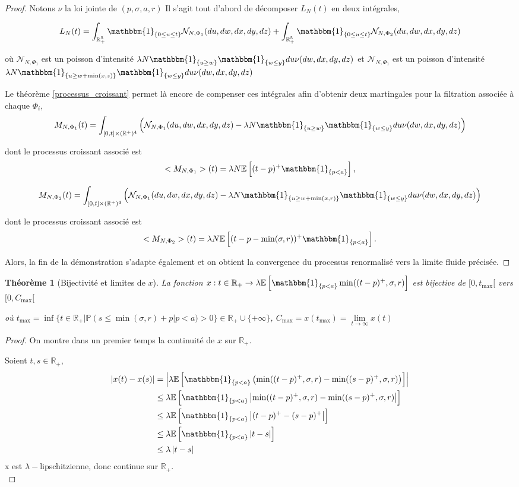 \documentclass[12pt,a4paper]{article}
\newcommand{\E}[1]{\mathbb{E}\left[ #1 \right]}
\newcommand{\R}{\mathbb{R}}
\newcommand{\1}[1]{\mathbbm{1}_{\{#1\}} }
\newtheorem{theorem}{Théorème}
\theoremstyle{definition}
\begin{document}
{\begin{proof}
Notons $\nu$ la loi jointe de $(p,\sigma,a,r)$
Il s'agit tout d'abord de décomposer $L_N(t)$ en deux intégrales,

$$L_N(t) = \int_{\R_+^5} \1{0\leq u \leq t} \mathcal{N}_{N,\Phi_1}(du,dw,dx,dy,dz) + \int_{\R_+^5} \1{0\leq u \leq t} \mathcal{N}_{N,\Phi_2}(du,dw,dx,dy,dz)$$

où $\mathcal{N}_{N,\Phi_1}$ est un poisson d'intensité $\lambda N \1{u\geq w}\1{w\leq y} du \nu(dw,dx,dy,dz)$ et  $\mathcal{N}_{N,\Phi_1}$ est un poisson d'intensité $\lambda N \1{u\geq w + \min(x,z)}\1{w\leq y} du \nu(dw,dx,dy,dz)$


Le théorème \ref{processus_croissant} permet là encore de compenser ces intégrales afin d'obtenir deux martingales pour la filtration associée à chaque $\Phi_i$,
$$M_{N,\Phi_1}(t) = \int_{[0,t]\times (\R^+)^4}  \left(\mathcal{N}_{N,\Phi_1}(du,dw,dx,dy,dz)-\lambda N \1{u\geq w}\1{w\leq y} du \nu(dw,dx,dy,dz)\right)$$

dont le processus croissant associé est $$<M_{N,\Phi_1}>(t) = \lambda N \E{(t-p)^+\1{p<a}},$$

$$M_{N,\Phi_2}(t) = \int_{[0,t]\times (\R^+)^4}  \left(\mathcal{N}_{N,\Phi_1}(du,dw,dx,dy,dz)-\lambda N \1{u\geq w+\min(x,r)}\1{w\leq y} du \nu(dw,dx,dy,dz)\right)$$

dont le processus croissant associé est $$<M_{N,\Phi_2}>(t) = \lambda N \E{(t-p-\min(\sigma,r))^+\1{p<a}}.$$

Alors, la fin de la démonstration s'adapte également et on obtient la convergence du processus renormalisé vers la limite fluide précisée.

\end{proof}

\begin{theorem}[Bijectivité et limites de $x$]

La fonction $x:t\in \R_+\to  \lambda\E{\1{p<a}\min((t-p)^+,\sigma,r)}$ est bijective de $[0,t_{\max}[$ vers $[0,C_{\max}[$

où $t_{\max} =  \inf \{t \in \R_+ | \mathbb{P}\left(s \leq \min(\sigma,r) + p\right|p<a) > 0\} \in \R_+\cup \{+\infty\}$,
$C_{\max} = x(t_{\max}) = \underset{t\to \infty}{\lim} x(t)$

\end{theorem}

\begin{proof}

On montre dans un premier temps la continuité de $x$ sur $\R_+$.

Soient $t,s \in \R_+$,
\begin{align*}
|x(t) - x(s)| &=\left| \lambda\E{\1{p<a}\left(\min((t-p)^+,\sigma,r)-\min((s-p)^+,\sigma,r)\right)}\right|\\
&\leq \lambda\E{\1{p<a}\left|\min((t-p)^+,\sigma,r)-\min((s-p)^+,\sigma,r)\right|}\\
&\leq \lambda\E{\1{p<a}\left|(t-p)^+-(s-p)^+\right|}\\
&\leq \lambda\E{\1{p<a}\left|t-s\right|}\\
&\leq \lambda\left|t-s\right|
\end{align*} 
x est $\lambda-$lipschitzienne, donc continue sur $\R_+$.\\
\medskip


\end{proof}}
\end{document}
